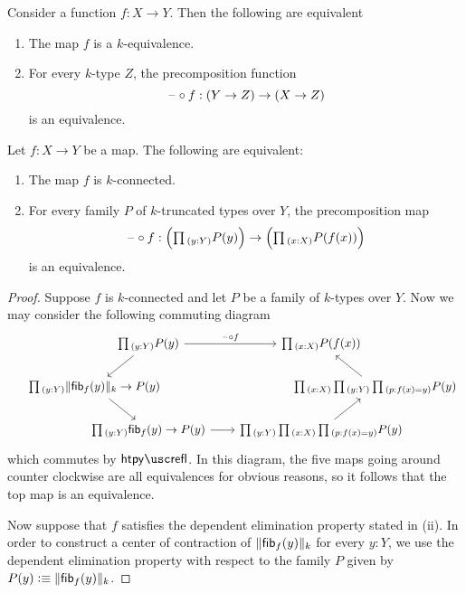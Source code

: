 \begin{thm}\label{thm:k-equiv-precomp}
  Consider a function $f:X\to Y$. Then the following are equivalent
  \begin{enumerate}
  \item The map $f$ is a $k$-equivalence.
  \item For every $k$-type $Z$, the precomposition function
    \begin{equation*}
      \blank\circ f:(Y\to Z)\to(X\to Z)
    \end{equation*}
    is an equivalence.
  \end{enumerate}
\end{thm}

\begin{thm}\label{thm:conn-dup}
  Let $f:X\to Y$ be a map. The following are equivalent:
  \begin{enumerate}
  \item The map $f$ is $k$-connected.
  \item For every family $P$ of $k$-truncated types over $Y$, the precomposition map
    \begin{equation*}
      \blank\circ f : \Big(\prd{y:Y}P(y)\Big)\to\Big(\prd{x:X}P(f(x))\Big)
    \end{equation*}
    is an equivalence.
  \end{enumerate}
\end{thm}

\begin{proof}
  Suppose $f$ is $k$-connected and let $P$ be a family of $k$-types over $Y$. Now we may consider the following commuting diagram
  \begin{equation*}
    \begin{tikzcd}[column sep=-10em]
      \phantom{\prd{x:X}{y:Y}{p:f(x)=y}P(y)} & \prd{y:Y}P(y) \arrow[r,"\blank\circ f"] \arrow[dl] &[10em] \prd{x:X}P(f(x)) \\
      \prd{y:Y}\trunc{k}{\fib{f}{y}}\to P(y) \arrow[dr] & \phantom{\prd{y:Y}{x:X}{p:f(x)=y}P(y)} & & \prd{x:X}{y:Y}{p:f(x)=y}P(y) \arrow[ul] \\
      & \prd{y:Y}\fib{f}{y}\to P(y) \arrow[r] & \prd{y:Y}{x:X}{p:f(x)=y}P(y) \arrow[ur]
    \end{tikzcd}
  \end{equation*}
  which commutes by $\htpyrefl$. In this diagram, the five maps going around counter clockwise are all equivalences for obvious reasons, so it follows that the top map is an equivalence.

  Now suppose that $f$ satisfies the dependent elimination property stated in (ii). In order to construct a center of contraction of $\trunc{k}{\fib{f}{y}}$ for every $y:Y$, we use the dependent elimination property with respect to the family $P$ given by $P(y)\defeq\trunc{k}{\fib{f}{y}}$. 
\end{proof}

